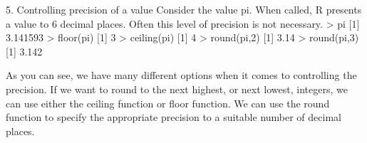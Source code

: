 5. Controlling precision of a value
Consider the value pi.  When called, R presents a value to 6 decimal places.
Often this level of precision is not necessary.
> pi
[1] 3.141593
> floor(pi)
[1] 3
> ceiling(pi)
[1] 4
> round(pi,2)
[1] 3.14
> round(pi,3)
[1] 3.142

As you can see, we have many different options when it comes to controlling the precision. If we want to round to the next highest, or next lowest, integers, we can use either the ceiling function or floor function.
We can use the round function to specify the appropriate precision to a suitable number of decimal places.




